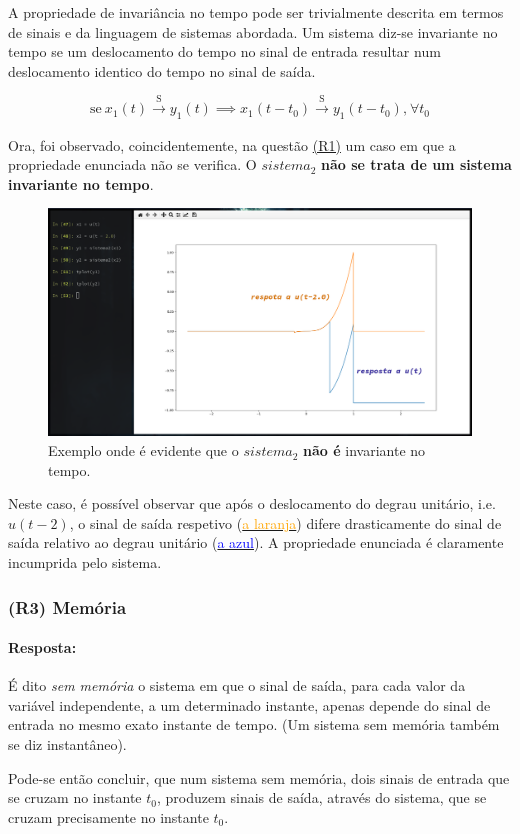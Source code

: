 A propriedade de invariância no tempo pode ser trivialmente descrita em termos de sinais e da linguagem de sistemas abordada. Um sistema diz-se invariante no tempo se um deslocamento do tempo no sinal de entrada resultar num deslocamento identico do tempo no sinal de saída.

    \[ \text{se}\ x_1(t) \xrightarrow[]{\text{S}} y_1(t) \implies x_1(t-t_0) \xrightarrow[]{\text{S}} y_1(t-t_0) \text{,}\ \forall t_0 \]

Ora, foi observado, coincidentemente, na questão \hyperref[fig:a]{(R1)} um caso em que a propriedade enunciada não se verifica.  O \(sistema_2\) \textbf{não se trata de um sistema invariante no tempo}.

\begin{figure}[ht]
    \centering
    \includegraphics[width = 0.5\linewidth]{prints/variancia.png}
    \caption{Exemplo onde é evidente que o \(sistema_2\) \textbf{não é} invariante no tempo.}
    \label{fig:timeshift}
\end{figure}

Neste caso, é possível observar que após o deslocamento do degrau unitário, i.e. \(u(t - 2)\), o sinal de saída respetivo (\hyperref[fig:timeshift]{\textcolor{Orange}{a laranja}}) difere drasticamente do sinal de saída relativo ao degrau unitário (\hyperref[fig:timeshift]{\textcolor{Blue}{a azul}}). A propriedade enunciada é claramente incumprida pelo sistema.
\subsubsection{(R3) Memória}
\label{subsubsec:R3}
\paragraph{Resposta:} %
É dito \textit{sem memória} o sistema em que o sinal de saída, para cada valor da variável independente, a um determinado instante, apenas depende do sinal de entrada no mesmo exato instante de tempo. (Um sistema sem memória também se diz instantâneo).

Pode-se então concluir, que num sistema sem memória, dois sinais de entrada que se cruzam no instante \(t_0\), produzem sinais de saída, através do sistema, que se cruzam precisamente no instante \(t_0\).

